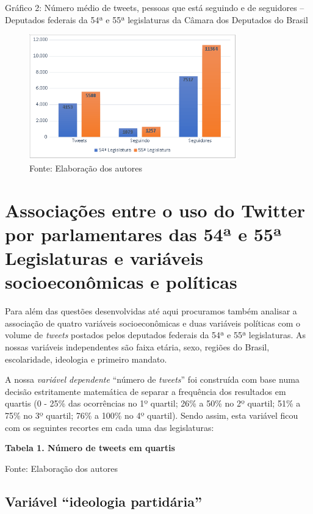 Gráfico 2: Número médio de tweets, pessoas que está seguindo e de
seguidores -- Deputados federais da 54ª e 55ª legislaturas da Câmara dos
Deputados do Brasil

\begin{figure}[!ht]
\centering
 \includegraphics[width=90mm]{./imgs/graf2_2.png}
\caption{Fonte: Elaboração dos autores}
\end{figure}


\section{Associações entre o uso do Twitter por parlamentares das 54ª
e 55ª Legislaturas e variáveis socioeconômicas e políticas}

Para além das questões desenvolvidas até aqui procuramos também analisar
a associação de quatro variáveis socioeconômicas e duas variáveis
políticas com o volume de \emph{tweets} postados pelos deputados
federais da 54ª e 55ª legislaturas. As nossas variáveis independentes
são faixa etária, sexo, regiões do Brasil, escolaridade, ideologia e
primeiro mandato.

A nossa \emph{variável dependente} ``número de \emph{tweets}'' foi
construída com base numa decisão estritamente matemática de separar a
frequência dos resultados em quartis (0 - 25\% das ocorrências no 1º
quartil; 26\% a 50\% no 2º quartil; 51\% a 75\% no 3º quartil; 76\% a
100\% no 4º quartil). Sendo assim, esta variável ficou com os seguintes
recortes em cada uma das legislaturas:

\textbf{Tabela 1. Número de tweets em quartis}

Fonte: Elaboração dos autores

\subsection{Variável ``ideologia partidária''}

